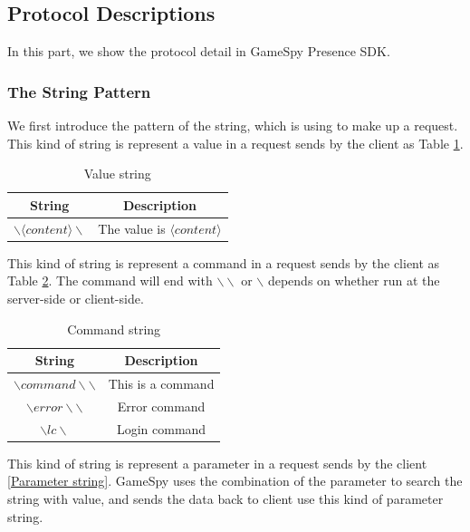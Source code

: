 \documentclass[oneside,titlepage,a4paper]{report} %
\begin{document}
\subsection{Protocol Descriptions}

In this part, we show the protocol detail in GameSpy Presence SDK.
\subsubsection{The String Pattern}
We first introduce the pattern of the string, which is using to make up a request.
This kind of string is represent a value in a request sends by the client as Table \ref{Value string}.

\begin{table}[H]
	\centering
	\begin{tabular}{|c|c|}
		\hline 
		String&Description  \\ 
		\hline 
	$ \backslash \langle content \rangle \backslash $& The value is $ \langle content \rangle $  \\ 
		\hline 
	\end{tabular} 
\caption{Value string}
\label{Value string}
\end{table}

This kind of string is represent a command in a request sends by the client as Table \ref{Command string}. The command will end with $ \backslash \backslash $ or $ \backslash $ depends on whether run at the server-side or client-side.


\begin{table}[H]
	\centering
	\begin{tabular}{|c|c|}
		\hline 
		String&Description  \\ 
		\hline 
		$ \backslash command \backslash\backslash $& This is a command \\ 		
		\hline 
		$ \backslash error \backslash \backslash $ & Error command \\
		 \hline
		 $\backslash lc \backslash$& Login command\\
		 \hline
	\end{tabular} 
	\caption{Command string}
	\label{Command string}
\end{table}

This kind of string is represent a parameter in a request sends by the client \ref{Parameter string}. GameSpy uses the combination of the parameter to search the string with value, and sends the data back to client use this kind of parameter string.
\end{document}
